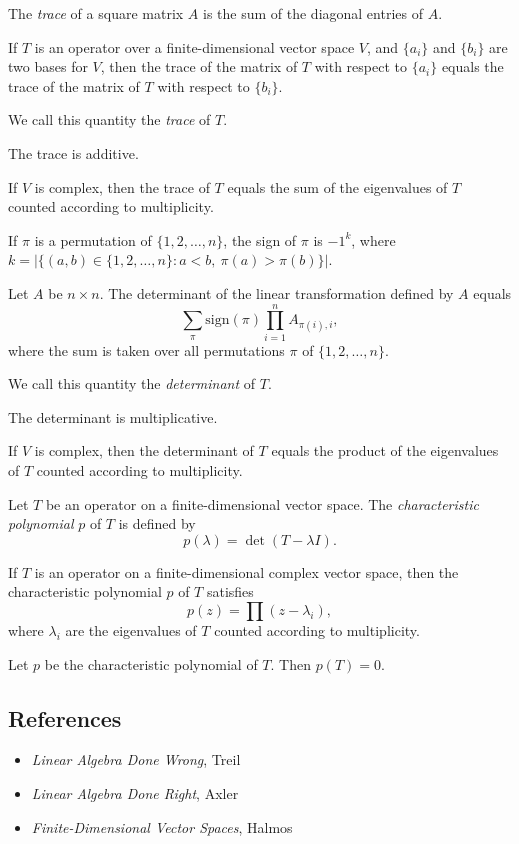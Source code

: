\begin{defn}
  The \emph{trace} of a square matrix $A$ is the sum of the diagonal entries of
  $A$.
\end{defn}
\begin{prop}
  If $T$ is an operator over a finite-dimensional vector space $V$, and
  $\{a_i\}$ and $\{b_i\}$ are two bases for $V$, then the trace of the matrix of
  $T$ with respect to $\{a_i\}$ equals the trace of the matrix of $T$ with
  respect to $\{b_i\}$.
\end{prop}
\begin{defn}
  We call this quantity the \emph{trace} of $T$.
\end{defn}
\begin{prop}
  The trace is additive.
\end{prop}
\begin{prop}
  If $V$ is complex, then the trace of $T$ equals the sum of the eigenvalues of
  $T$ counted according to multiplicity.
\end{prop}
\begin{defn}
  If $\pi$ is a permutation of $\{1,2,\ldots,n\}$, the sign of $\pi$ is $-1^k$,
  where $k=|\{(a,b)\in\{1,2,\ldots,n\}:a<b,\ \pi(a)>\pi(b)\}|$.
\end{defn}
\begin{prop}
  Let $A$ be $n\times n$. The determinant of the linear transformation defined
  by $A$ equals
  \[\sum_\pi\mathrm{sign}(\pi)\prod_{i=1}^n A_{\pi(i),i},\] 
  where the sum is taken over all permutations $\pi$ of $\{1,2,\ldots,n\}$.
\end{prop}
\begin{defn}
  We call this quantity the \emph{determinant} of $T$.
\end{defn}
\begin{prop}
  The determinant is multiplicative.
\end{prop}
\begin{prop}
  If $V$ is complex, then the determinant of $T$ equals the product of the
  eigenvalues of $T$ counted according to multiplicity.
\end{prop}
\begin{defn}
  Let $T$ be an operator on a finite-dimensional vector space. The
  \emph{characteristic polynomial} $p$ of $T$ is defined by
  \[p(\lambda)=\det(T-\lambda I).\]
\end{defn}
\begin{prop}
  If $T$ is an operator on a finite-dimensional complex vector space, then the
  characteristic polynomial $p$ of $T$ satisfies
  \[p(z)=\prod(z-\lambda_i),\]
  where $\lambda_i$ are the eigenvalues of $T$ counted according to
  multiplicity.
\end{prop}
\begin{thm}
  Let $p$ be the characteristic polynomial of $T$. Then $p(T)=0$.
\end{thm}
\subsection*{References}
\begin{itemize}
  \item \emph{Linear Algebra Done Wrong}, Treil
  \item \emph{Linear Algebra Done Right}, Axler
  \item \emph{Finite-Dimensional Vector Spaces}, Halmos
\end{itemize}
